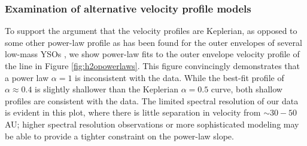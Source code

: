 \documentclass[twocolumn]{aastex61}
\newcommand{\sourcei}{SrcI\xspace}
\begin{document}
% 
% 

\subsubsection{Examination of alternative velocity profile models}
To support the argument that the velocity profiles are Keplerian, as opposed to
some other power-law profile as has been found for the outer envelopes of
several low-mass YSOs
\citep{Lee2017h,Aso2017b,Ohashi2014a,Lindberg2014a,Murillo2013a}, we show
power-law fits to the outer envelope velocity profile of the \water line
in Figure \ref{fig:h2opowerlaws}.
This figure convincingly demonstrates that
a power law $\alpha=1$ \citep[e.g., as observed in the outer parts of low-mass
YSO disks;][]{Aso2017b} is inconsistent with the data.  While the best-fit
profile of $\alpha\approx0.4$ is slightly shallower than the Keplerian
$\alpha=0.5$ curve, both shallow profiles are consistent with the data.
The limited spectral resolution of our data is evident in this plot, where
there is little separation in velocity from $\sim30-50$ AU; higher
spectral resolution observations or more sophisticated modeling may be able to
provide a tighter constraint on the power-law slope.
\end{document}
